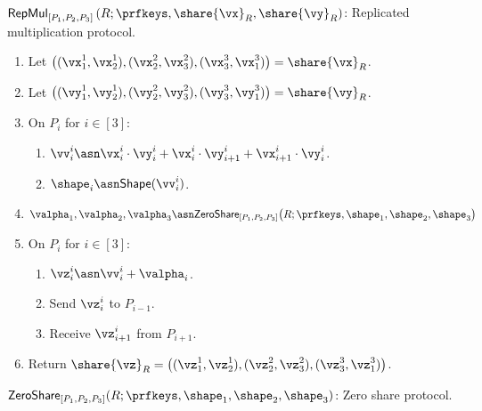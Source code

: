 \msubsubsection
{$\mathsf{RepMul}_{[P_1, P_2, P_3]}\left( R; \prfkeys, \share{\vx}_R, \share{\vy}_R \right)$:}
\label{fig:replicated-mul}
  Replicated multiplication protocol.
  \begin{enumerate}
  \item Let $\left( (\vx_1^1, \vx_2^1), (\vx_2^2, \vx_3^2), (\vx_3^3, \vx_1^3) \right) = \share{\vx}_R$.
  \item Let $\left( (\vy_1^1, \vy_2^1), (\vy_2^2, \vy_3^2), (\vy_3^3, \vy_1^3) \right) = \share{\vy}_R$.

  \item On $P_i$ for $i \in [3]$:
  \begin{enumerate}
    \item $\vv_i^i \asn \vx_i^i \cdot \vy_i^i + \vx_i^i \cdot \vy_{i+1}^i + \vx_{i+1}^i \cdot \vy_i^i$.
    \item $\shape_i \asn \mathsf{Shape}(\vv_i^i)$.
  \end{enumerate}

  \item $\valpha_1, \valpha_2, \valpha_3 \asn \mathsf{ZeroShare}_{[P_1, P_2, P_3]}\big( R; \prfkeys, \shape_1, \shape_2, \shape_3 \big)$

  \item On $P_i$ for $i \in [3]$:
  \begin{enumerate}
    \item $\vz_i^i \asn \vv_i^i + \valpha_i$.
    \item Send $\vz_i^i$ to $P_{i-1}$.
    \item Receive $\vz_{i+1}^i$ from $P_{i+1}$.
  \end{enumerate}

  \item Return $\share{\vz}_R = \left( (\vz_1^1, \vz_2^1), (\vz_2^2, \vz_3^2), (\vz_3^3, \vz_1^3) \right)$.
  \end{enumerate}

\msubsubsection
{$\mathsf{ZeroShare}_{[P_1, P_2, P_3]}(R; \prfkeys, \shape_1, \shape_2, \shape_3)$:}
\label{fig:replicated-sample-zero}
  Zero share protocol.

